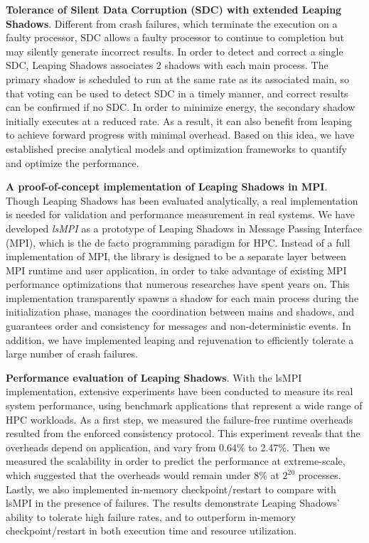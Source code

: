 \textbf{Tolerance of Silent Data Corruption (SDC) with extended Leaping Shadows}.
Different from crash failures, which terminate the execution on a faulty processor, SDC allows a faulty processor to continue to completion but may silently generate incorrect results. In order to detect and correct a single SDC, Leaping Shadows associates 2 shadows with each main process. The primary shadow is scheduled to run at the same rate as its associated main, so that voting can be used to detect SDC in a timely manner, and correct results can be confirmed if no SDC. In order to minimize energy, the secondary shadow initially executes at a reduced rate. As a result, it can also benefit from leaping to achieve forward progress with minimal overhead. Based on this idea, we have established precise analytical models and optimization frameworks to
quantify and optimize the performance. 

\textbf{A proof-of-concept implementation of Leaping Shadows in MPI}.
Though Leaping Shadows has been evaluated analytically, a real implementation 
is needed for validation and performance measurement in real systems. We have developed \textit{lsMPI} as a prototype of Leaping Shadows in Message Passing Interface (MPI), which is the de facto programming paradigm for HPC. 
Instead of a full implementation of MPI, the library is designed to be a separate layer between MPI runtime and user application, in order to take advantage of existing MPI performance optimizations that numerous researches have spent years on. 
This implementation transparently spawns 
a shadow for each main process during the initialization phase, manages the coordination between mains and shadows, 
and guarantees order and consistency for messages and non-deterministic events. 
In addition, we have implemented leaping and rejuvenation to efficiently tolerate a large number of crash failures. 


\textbf{Performance evaluation of Leaping Shadows}.
With the lsMPI implementation, extensive experiments have been conducted to measure its real system performance, using benchmark applications that represent a wide range of HPC workloads. As a first step, we measured the failure-free runtime overheads resulted from the enforced consistency protocol. This experiment reveals that the overheads depend on application, and vary from 0.64\% to 2.47\%. Then we measured the scalability in order to predict the performance at extreme-scale, which suggested that the overheads would remain under 8\% at $2^{20}$ processes. Lastly, we also implemented in-memory checkpoint/restart to compare with lsMPI in the presence of failures. The results demonstrate Leaping Shadows'
ability to tolerate high failure rates, and to outperform in-memory checkpoint/restart in both execution time and
resource utilization.

